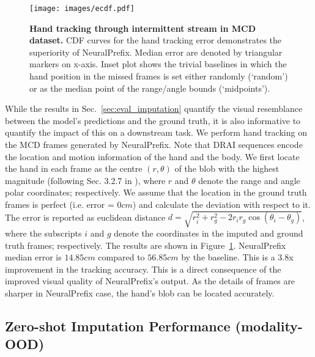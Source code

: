 \documentclass[10pt, conference, compsocconf]{IEEEtran}
\def\update#1{#1}
\begin{document}
\begin{figure}
    \centering
    \texttt{[image: images/ecdf.pdf]}
    \caption{\textbf{Hand tracking through intermittent stream in MCD dataset.} CDF curves for the hand tracking error demonstrates the superiority of NeuralPrefix. Median error are denoted by triangular markers on x-axis. Inset plot shows the trivial baselines in which the hand position in the missed frames is set either randomly (`random') or as the median point of the range/angle bounds (`midpoints').  }
    \label{fig:CDF_tracking}
\end{figure}


While the results in Sec.~\ref{sec:eval_imputation} quantify the visual resemblance between the model's predictions and the ground truth, it is also informative to quantify the impact of this on a downstream task.  We perform hand tracking on the MCD frames generated by NeuralPrefix. Note that DRAI sequences encode the location and motion information of the hand and the body. We first locate the hand in each frame as the centre $(r,\theta)$ of the blob with the highest magnitude (following Sec. 3.2.7 in \cite{li2022towards}), where $r$ and $\theta$ denote the range and angle polar coordinates; respectively. We assume that the location in the ground truth frames is perfect (i.e. error = $0cm$) and calculate the deviation with respect to it.  The error is reported as euclidean distance $d = \sqrt{r_{i}^2 + r_{g}^2 - 2r_{i} r_{g} \cos(\theta_{i} - \theta_{g})}$, where the subscripts $i$ and $g$ denote the coordinates in the imputed and ground truth frames; respectively. The results are shown in Figure~\ref{fig:CDF_tracking}.
NeuralPrefix median error is $14.85cm$ compared to $56.85cm$ by the baseline. This \update{is a} $3.8$x improvement in the tracking accuracy.  This is a direct consequence of the improved visual quality of NeuralPrefix's output. As the details of frames are sharper in NeuralPrefix case, the hand's blob can be located accurately.



\subsection{Zero-shot Imputation Performance (modality-OOD) }
\label{sec:out_of_domain}
\end{document}
